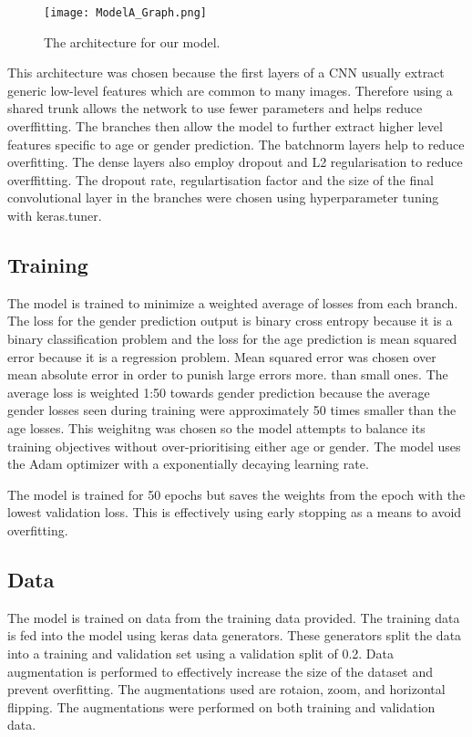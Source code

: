 \begin{figure}
    \centering
    \texttt{[image: ModelA\_Graph.png]}
    \caption{\label{fig:ModelAGraph} The architecture for our model.}
\end{figure}

This architecture was chosen because the first layers of a CNN usually extract generic low-level features which are 
common to many images. Therefore using a shared trunk allows the network to use fewer parameters and helps reduce 
overffitting. The branches then allow the model to further extract higher level features specific to age or gender 
prediction. The batchnorm layers help to reduce overfitting. The dense layers also employ dropout and L2 regularisation
to reduce overffitting. The dropout rate, regulartisation factor and the size of the final convolutional layer in 
the branches were chosen using hyperparameter tuning with keras.tuner.

\subsection{Training}
The model is trained to minimize a weighted average of losses from each branch. The loss for the gender prediction
output is binary cross entropy because it is a binary classification problem and the loss for the age prediction 
is mean squared error because it is a regression problem. Mean squared error was chosen over mean absolute error 
in order to punish large errors more. than small ones. The average loss is weighted 1:50 towards gender prediction
because the average gender losses seen during training were approximately 50 times smaller than the age losses. This 
weighitng was chosen so the model attempts to balance its training objectives without over-prioritising either age or 
gender. The model uses the Adam optimizer with a exponentially decaying learning rate. 

The model is trained for 50 epochs but saves the weights from the epoch with the lowest validation loss. This is 
effectively using early stopping as a means to avoid overfitting.

\subsection{Data}
The model is trained on data from the training data provided. The training data is fed into the model using keras 
data generators. These generators split the data into a training and validation set using a validation split of 0.2. 
Data augmentation is performed to effectively increase the size of the dataset and prevent overfitting. The augmentations
used are rotaion, zoom, and horizontal flipping. The augmentations were performed on both training and validation data.

